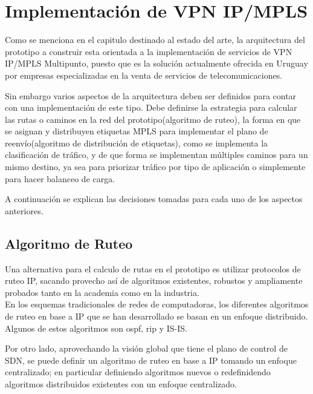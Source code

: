 \section[Implementaci\'on de VPN IP/MPLS]{Implementaci\'on de VPN IP/MPLS}

Como se menciona en el capitulo destinado al estado del arte, la arquitectura del prototipo a construir esta orientada a la implementaci\'on de servicios de VPN IP/MPLS Multipunto, puesto que es la soluci\'on actualmente ofrecida en Uruguay por empresas especializadas en la venta de servicios de telecomunicaciones. 

Sin embargo varios aspectos de la arquitectura deben ser definidos para contar con una implementaci\'on de este tipo. Debe definirse la estrategia para calcular las rutas o caminos en la red del prototipo(algoritmo de ruteo), la forma en que se asignan y distribuyen etiquetas MPLS para implementar el plano de reenvío(algoritmo de distribución de etiquetas), como se implementa la clasificaci\'on de tr\'afico, y de que forma se implementan múltiples caminos para un mismo destino, ya sea para priorizar tr\'afico por tipo de aplicaci\'on o simplemente para hacer balanceo de carga. 

A continuaci\'on se explican las decisiones tomadas para cada uno de los aspectos anteriores.

\subsection{Algoritmo de Ruteo}

Una alternativa para el calculo de rutas en el prototipo es utilizar protocolos de ruteo IP, sacando provecho as\'i de algoritmos existentes, robustos y ampliamente probados tanto en la academia como en la industria.\\


En los esquemas tradicionales de redes de computadoras, los diferentes algoritmos de ruteo en base a IP que se han desarrollado se basan en un enfoque distribuido. Algunos de estos algoritmos son ospf, rip y IS-IS.

Por otro lado, aprovechando la visión global que tiene el plano de control de SDN, se puede definir un algoritmo de ruteo en base a IP tomando un enfoque centralizado; en particular definiendo algoritmos nuevos o redefinidendo algoritmos distribuidos existentes con un enfoque centralizado.

